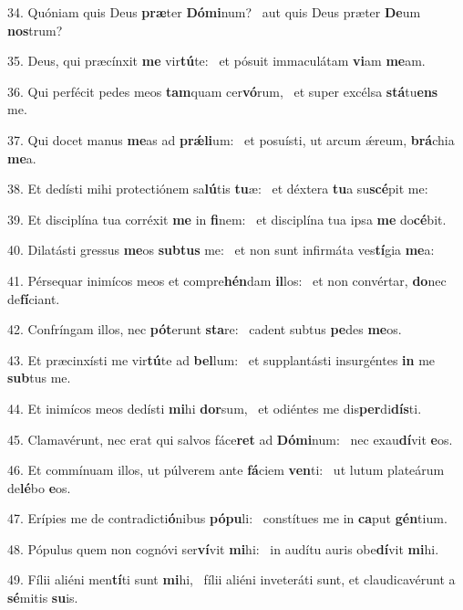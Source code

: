 34. Quóniam quis Deus \textbf{præ}ter \textbf{Dó}\textbf{mi}num? \ast\  aut quis Deus præter \textbf{De}um \textbf{nos}trum?\

35. Deus, qui præcínxit \textbf{me} vir\textbf{tú}te: \ast\  et pósuit immaculátam \textbf{vi}am \textbf{me}am.\

36. Qui perfécit pedes meos \textbf{tam}quam cer\textbf{vó}rum, \ast\  et super excélsa \textbf{stá}tu\textbf{ens} me.\

37. Qui docet manus \textbf{me}as ad \textbf{prǽ}\textbf{li}um: \ast\  et posuísti, ut arcum ǽreum, \textbf{brá}chia \textbf{me}a.\

38. Et dedísti mihi protectiónem sa\textbf{lú}tis \textbf{tu}æ: \ast\  et déxtera \textbf{tu}a su\textbf{scé}pit me:\

39. Et disciplína tua corréxit \textbf{me} in \textbf{fi}nem: \ast\  et disciplína tua ipsa \textbf{me} do\textbf{cé}bit.\

40. Dilatásti gressus \textbf{me}os \textbf{sub}\textbf{tus} me: \ast\  et non sunt infirmáta ves\textbf{tí}gia \textbf{me}a:\

41. Pérsequar inimícos meos et compre\textbf{hén}dam \textbf{il}los: \ast\  et non convértar, \textbf{do}nec de\textbf{fí}ciant.\

42. Confríngam illos, nec \textbf{pót}erunt \textbf{sta}re: \ast\  cadent subtus \textbf{pe}des \textbf{me}os.\

43. Et præcinxísti me vir\textbf{tú}te ad \textbf{bel}lum: \ast\  et supplantásti insurgéntes \textbf{in} me \textbf{sub}tus me.\

44. Et inimícos meos dedísti \textbf{mi}hi \textbf{dor}sum, \ast\  et odiéntes me dis\textbf{per}di\textbf{dís}ti.\

45. Clamavérunt, nec erat qui salvos fáce\textbf{ret} ad \textbf{Dó}\textbf{mi}num: \ast\  nec exau\textbf{dí}vit \textbf{e}os.\

46. Et commínuam illos, ut púlverem ante \textbf{fá}ciem \textbf{ven}ti: \ast\  ut lutum plateárum de\textbf{lé}bo \textbf{e}os.\

47. Erípies me de contradicti\textbf{ó}nibus \textbf{pó}\textbf{pu}li: \ast\  constítues me in \textbf{ca}put \textbf{gén}tium.\

48. Pópulus quem non cognóvi ser\textbf{ví}vit \textbf{mi}hi: \ast\  in audítu auris obe\textbf{dí}vit \textbf{mi}hi.\

49. Fílii aliéni men\textbf{tí}ti sunt \textbf{mi}hi, \ast\  fílii aliéni inveteráti sunt, et claudicavérunt a \textbf{sé}mitis \textbf{su}is.\

